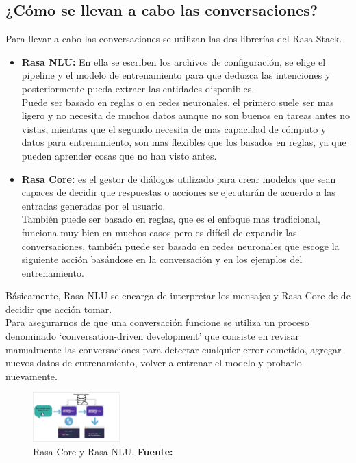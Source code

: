 \subsection{¿Cómo se llevan a cabo las conversaciones?}
Para llevar a cabo las conversaciones se utilizan las dos librerías del Rasa Stack.
\begin{itemize}
    \item \textbf{Rasa NLU: } En ella  se escriben los archivos de configuración, se elige el pipeline y el modelo de entrenamiento para que deduzca las intenciones y posteriormente pueda extraer las entidades disponibles.\\
    \indent Puede ser basado en reglas o en redes neuronales, el primero suele ser mas ligero y no necesita de muchos datos aunque no son buenos en tareas antes no vistas, mientras que el segundo necesita de mas capacidad de cómputo y datos para entrenamiento, son mas flexibles que los basados en reglas, ya que pueden aprender cosas que no han visto antes.
    \item \textbf{Rasa Core: } es el gestor de diálogos utilizado para crear modelos que sean capaces de decidir que respuestas o acciones se ejecutarán de acuerdo a las entradas generadas por el usuario.\\
    También puede ser basado en reglas, que es el enfoque mas tradicional, funciona muy bien en muchos casos pero es difícil de expandir las conversaciones, también puede ser basado en redes neuronales que escoge la siguiente acción basándose en la conversación y en los ejemplos del entrenamiento.
\end{itemize}
\indent Básicamente, Rasa NLU se encarga de interpretar los mensajes y Rasa Core de de decidir que acción tomar.\\
\indent Para asegurarnos de que una conversación funcione se utiliza un proceso denominado ‘conversation-driven development’ que consiste en revisar manualmente las conversaciones para detectar cualquier error cometido, agregar nuevos datos de entrenamiento, volver a entrenar el modelo y probarlo nuevamente. \cite{Introduction_to_Rasa}
\begin{figure}[H]
\begin{centering}
\includegraphics[angle=0,width=0.3\textwidth]{Figuras/NLU-CORE.png}
\par \end{centering}
\caption[Rasa Core y Rasa NLU]{Rasa Core y Rasa NLU. \textbf{Fuente:} \cite{Rasa_Core-NLU}}
\label{Core-NLU}
\end{figure}


